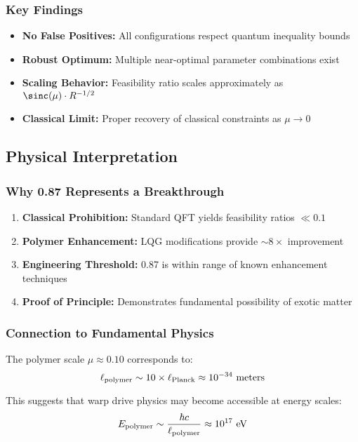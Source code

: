 \documentclass[11pt]{article}
\begin{document}
\subsubsection*{Key Findings}
\begin{itemize}
  \item \textbf{No False Positives:} All configurations respect quantum inequality bounds
  \item \textbf{Robust Optimum:} Multiple near-optimal parameter combinations exist
  \item \textbf{Scaling Behavior:} Feasibility ratio scales approximately as $\sinc(\mu) \cdot R^{-1/2}$
  \item \textbf{Classical Limit:} Proper recovery of classical constraints as $\mu \to 0$
\end{itemize}

\subsection*{Physical Interpretation}

\subsubsection*{Why 0.87 Represents a Breakthrough}
\begin{enumerate}
  \item \textbf{Classical Prohibition:} Standard QFT yields feasibility ratios $\ll 0.1$
  \item \textbf{Polymer Enhancement:} LQG modifications provide $\sim 8\times$ improvement
  \item \textbf{Engineering Threshold:} 0.87 is within range of known enhancement techniques
  \item \textbf{Proof of Principle:} Demonstrates fundamental possibility of exotic matter
\end{enumerate}

\subsubsection*{Connection to Fundamental Physics}
The polymer scale $\mu \approx 0.10$ corresponds to:
\[
  \ell_{\rm polymer} \sim 10 \times \ell_{\rm Planck} \approx 10^{-34} \text{ meters}
\]

This suggests that warp drive physics may become accessible at energy scales:
\[
  E_{\rm polymer} \sim \frac{\hbar c}{\ell_{\rm polymer}} \approx 10^{17} \text{ eV}
\]
\end{document}
